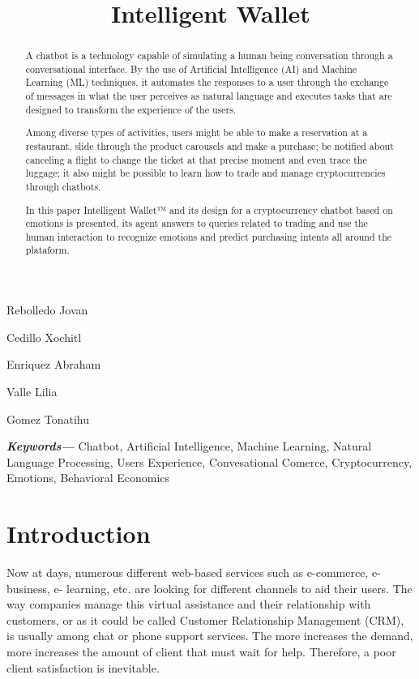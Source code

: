 \documentclass[	DIV=calc,%
							paper=letter,%
							fontsize=12pt%
                            ]{scrartcl}	 					%
\title{Intelligent Wallet}					%
\author{}											%
\date{}																				%
\newcommand{\initial}[1]{%
     \lettrine[lines=3,lhang=0.3,nindent=0em]{
     				\color{DarkGoldenrod}
     				{\textsf{#1}}}{}}
\providecommand{\keywords}[1]
{
  \small	
  \textbf{\textit{Keywords---}} #1
}
\begin{document}
\maketitle
\begin{center}
Rebolledo Jovan
 
Cedillo Xochitl 

Enriquez Abraham 
 
Valle Lilia 

Gomez Tonatihu
\end{center}





\newpage
\begin{abstract}
	
{A chatbot is a technology capable of simulating a human being conversation through a conversational interface. By the use of Artificial Intelligence (AI) and Machine Learning (ML) techniques, it automates the responses to a user through the exchange of messages in what the user perceives as natural language and executes tasks that are designed to transform the experience of the users.

Among diverse types of activities, users might be able to make a reservation   at a restaurant, slide through the product carousels and make a purchase; be notified about canceling a flight to change the ticket at that precise moment and even trace the luggage; it also might be possible to learn how to trade and manage cryptocurrencies through chatbots.

In this paper Intelligent Wallet™ and its design for a cryptocurrency chatbot based on emotions is presented. its agent  answers to queries related to trading and use the human interaction to recognize emotions and predict purchasing intents all around the plataform.}

\end{abstract}

\keywords{Chatbot, Artificial Intelligence, Machine Learning, Natural Language Processing, Users Experience, Convesational Comerce, Cryptocurrency, Emotions, Behavioral Economics}

\newpage
\tableofcontents
\newpage
\listoffigures
\newpage

\thispagestyle{fancy} 			%

\section{\label{sec:level1}Introduction}
Now at days, numerous different web-based services such as e-commerce, e-business, e- learning, etc. are looking for different channels to aid their users. The way companies manage this virtual assistance and their relationship with customers, or as it could be called Customer Relationship Management (CRM), is usually among chat or phone support services. The more increases the demand, more increases the amount of client that must wait for help.  Therefore, a poor client satisfaction is inevitable\cite{ranoliya2017chatbot_08126057}.
\end{document}
